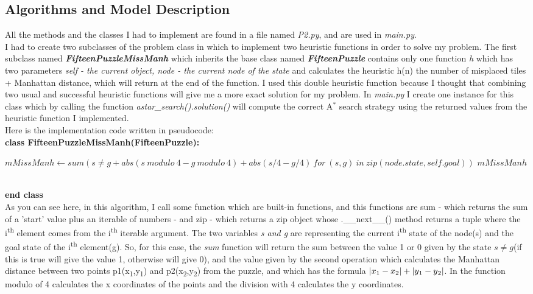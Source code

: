 \documentclass[14pt]{article}
\begin{document}
\subsection{Algorithms and Model Description}
All the methods and the classes I had to implement are found in a file named \textit{P2.py}, and are used in \textit{main.py}.
\vspace{2.5 mm}
\\I had to create two subclasses of the problem class in which to implement two heuristic functions in order to solve my problem. The first subclass named \textbf{\textit{FifteenPuzzleMissManh}} which inherits the base class named \textbf{\textit{FifteenPuzzle}} contains only one function \textit{h} which has two parameters \textit{self - the current object, node - the current node of the state} and calculates the heuristic h(n) \eq the number of misplaced tiles + Manhattan distance, which will return at the end of the function. I used this double heuristic function because I thought that combining two usual and successful heuristic functions will give me a more exact solution for my problem. In \textit{main.py} I create one instance for this class which by calling the function \textit{astar\_search().solution()} will compute the correct A$^{*}$ search strategy using the returned values from the heuristic function I implemented.
\vspace{2.5 mm}
\\Here is the implementation code written in pseudocode:
\vspace{2.5 mm}
\\\textbf{class FifteenPuzzleMissManh(FifteenPuzzle):}
\begin{algorithmic}
    \State $mMissManh \gets sum(s \neq g + abs(s \ modulo \ 4 - g \ modulo \ 4) + abs(s/4 - g/4) \ for \ (s, g) \ in \ zip(node.state, self.goal))$
    \State \Return $mMissManh$
\EndFunction
\end{algorithmic}
\\\textbf{end class}
\vspace{2.5 mm}
\\As you can see here, in this algorithm, I call some function which are built-in functions, and this functions are sum - which returns the sum of a 'start' value plus an iterable of numbers - and zip - which returns a zip object whose .\_\_next\_\_() method returns a tuple where the i\textsuperscript{th} element comes from the i\textsuperscript{th} iterable argument. The two variables \textit{s and g} are representing the current i\textsuperscript{th} state of the node(s) and the goal state of the i\textsuperscript{th} element(g). So, for this case, the \textit{sum} function will return the sum between the value 1 or 0 given by the state \textit{$s \neq g$}(if this is true will give the value 1, otherwise will give 0), and the value given by the second operation which calculates the Manhattan distance between two points p1(x\textsubscript{1},y\textsubscript{1}) and p2(x\textsubscript{2},y\textsubscript{2}) from the puzzle, and which has the formula $\left| x\textsubscript{1} - x\textsubscript{2} \right| + \left| y\textsubscript{1} - y\textsubscript{2} \right|$. In the function modulo of 4 calculates the x coordinates of the points and the division with 4 calculates the y coordinates.
\end{document}
